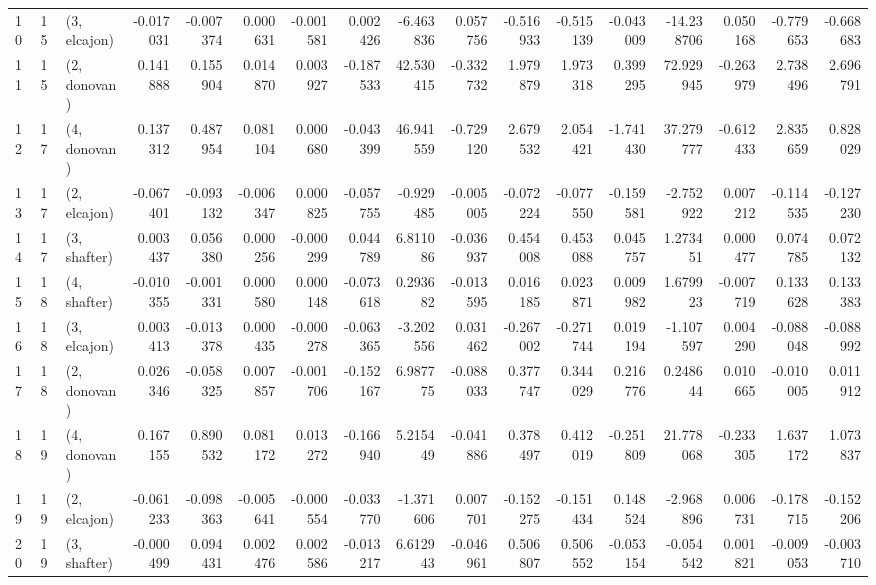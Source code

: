 \begin{tabular}{lllrrrrrrrrrrrrrr}
10 &    15 &  (3, elcajon) & -0.017031 & -0.007374 &   0.000631 & -0.001581 &  0.002426 &  -6.463836 &  0.057756 &  -0.516933 & -0.515139 & -0.043009 & -14.238706 &  0.050168 & -0.779653 & -0.668683 \\
11 &    15 &  (2, donovan) &  0.141888 &  0.155904 &   0.014870 &  0.003927 & -0.187533 &  42.530415 & -0.332732 &   1.979879 &  1.973318 &  0.399295 &  72.929945 & -0.263979 &  2.738496 &  2.696791 \\
12 &    17 &  (4, donovan) &  0.137312 &  0.487954 &   0.081104 &  0.000680 & -0.043399 &  46.941559 & -0.729120 &   2.679532 &  2.054421 & -1.741430 &  37.279777 & -0.612433 &  2.835659 &  0.828029 \\
13 &    17 &  (2, elcajon) & -0.067401 & -0.093132 &  -0.006347 &  0.000825 & -0.057755 &  -0.929485 & -0.005005 &  -0.072224 & -0.077550 & -0.159581 &  -2.752922 &  0.007212 & -0.114535 & -0.127230 \\
14 &    17 &  (3, shafter) &  0.003437 &  0.056380 &   0.000256 & -0.000299 &  0.044789 &   6.811086 & -0.036937 &   0.454008 &  0.453088 &  0.045757 &   1.273451 &  0.000477 &  0.074785 &  0.072132 \\
15 &    18 &  (4, shafter) & -0.010355 & -0.001331 &   0.000580 &  0.000148 & -0.073618 &   0.293682 & -0.013595 &   0.016185 &  0.023871 &  0.009982 &   1.679923 & -0.007719 &  0.133628 &  0.133383 \\
16 &    18 &  (3, elcajon) &  0.003413 & -0.013378 &   0.000435 & -0.000278 & -0.063365 &  -3.202556 &  0.031462 &  -0.267002 & -0.271744 &  0.019194 &  -1.107597 &  0.004290 & -0.088048 & -0.088992 \\
17 &    18 &  (2, donovan) &  0.026346 & -0.058325 &   0.007857 & -0.001706 & -0.152167 &   6.987775 & -0.088033 &   0.377747 &  0.344029 &  0.216776 &   0.248644 &  0.010665 & -0.010005 &  0.011912 \\
18 &    19 &  (4, donovan) &  0.167155 &  0.890532 &   0.081172 &  0.013272 & -0.166940 &   5.215449 & -0.041886 &   0.378497 &  0.412019 & -0.251809 &  21.778068 & -0.233305 &  1.637172 &  1.073837 \\
19 &    19 &  (2, elcajon) & -0.061233 & -0.098363 &  -0.005641 & -0.000554 & -0.033770 &  -1.371606 &  0.007701 &  -0.152275 & -0.151434 &  0.148524 &  -2.968896 &  0.006731 & -0.178715 & -0.152206 \\
20 &    19 &  (3, shafter) & -0.000499 &  0.094431 &   0.002476 &  0.002586 & -0.013217 &   6.612943 & -0.046961 &   0.506807 &  0.506552 & -0.053154 &  -0.054542 &  0.001821 & -0.009053 & -0.003710 \\

\end{tabular}
